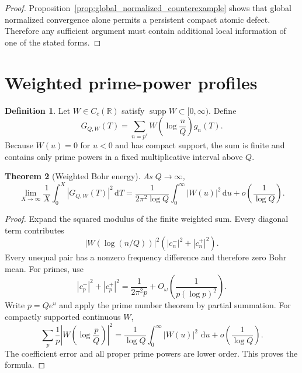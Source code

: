 \documentclass[11pt]{amsart}
\numberwithin{equation}{section}
\theoremstyle{plain}
\newtheorem{theorem}{Theorem}[section]
\theoremstyle{definition}
\newtheorem{definition}[theorem]{Definition}
\theoremstyle{remark}
\newcommand{\1}{\mathbf{1}}
\newcommand{\dd}{\,\mathrm{d}}
\begin{document}
\begin{proof}
Proposition~\ref{prop:global_normalized_counterexample} shows that global
normalized convergence alone permits a persistent compact atomic defect.
Therefore any sufficient argument must contain additional local
information of one of the stated forms.
\end{proof}

\section{Weighted prime-power profiles}
\label{sec:weighted_profiles}

\begin{definition}
\label{def:weighted_profile}
Let \(W\in C_c(\mathbb R)\) satisfy
\(\operatorname{supp}W\subset[0,\infty)\).  Define
\begin{equation}
G_{Q,W}(T)
=
\sum_{n=p^r}
W\left(\log\frac nQ\right)g_n(T).
\label{eq:weighted_profile_sum}
\end{equation}
Because \(W(u)=0\) for \(u<0\) and has compact support, the sum is finite
and contains only prime powers in a fixed multiplicative interval above
\(Q\).
\end{definition}

\begin{theorem}[Weighted Bohr energy]
\label{thm:weighted_bohr_energy}
As $Q\to\infty$,
\begin{equation}
\lim_{X\to\infty}\frac1X\int_0^X|G_{Q,W}(T)|^2\dd T
=
\frac1{2\pi^2\log Q}
\int_0^\infty|W(u)|^2\dd u
+
o\left(\frac1{\log Q}\right).
\label{eq:weighted_bohr_energy}
\end{equation}
\end{theorem}

\begin{proof}
Expand the squared modulus of the finite weighted sum.  Every diagonal term
contributes
\begin{equation}
|W(\log(n/Q))|^2
\left(|c_n^-|^2+|c_n^+|^2\right).
\label{eq:weighted_bohr_diagonal}
\end{equation}
Every unequal pair has a nonzero frequency difference and therefore zero
Bohr mean.  For primes, use
\begin{equation}
|c_p^-|^2+|c_p^+|^2
=
\frac1{2\pi^2p}
+
O_\omega\left(\frac1{p(\log p)^2}\right).
\label{eq:weighted_bohr_prime_coeff}
\end{equation}
Write \(p=Qe^u\) and apply the prime number theorem by partial summation.
For compactly supported continuous \(W\),
\begin{equation}
\sum_p\frac1p
\left|W\!\left(\log\frac pQ\right)\right|^2
=
\frac1{\log Q}
\int_0^\infty|W(u)|^2\,\dd u
+
o\left(\frac1{\log Q}\right).
\label{eq:weighted_bohr_pnt}
\end{equation}
The coefficient error and all proper prime powers are lower order.  This
proves the formula.
\end{proof}
\end{document}
